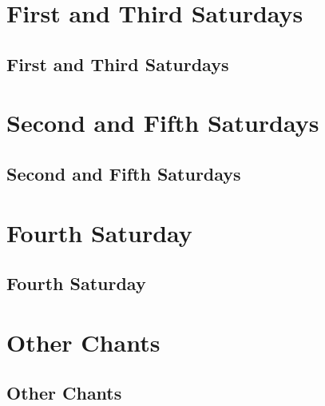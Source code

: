 \documentclass{kdo}
\begin{document}
\part{First and Third Saturdays}
\chapter{First and Third Saturdays}
\paliRefuges
\makaHannyaHaramittaShingyo
\enmeiJukkuKannonGyo
\songOfTheJewelMirrorSamadhi
\ancestorsShort
\femaleAncestors
\pagebreak
\jiHoSan

\part{Second and Fifth Saturdays}
\chapter{Second and Fifth Saturdays}
\paliRefuges
\makaHannyaHaramittaShingyo
\shosaimyoKichijoDharani
\harmonyOfDifferenceAndEquality
\ancestorsLong
\jiHoSan

\part{Fourth Saturday}
\chapter{Fourth Saturday}
\paliRefuges
\makaHannyaHaramittaShingyo
\shosaimyoKichijoDharani
\lovingKindnessMeditation
\enmeiJukkuKannonGyo
\jiHoSan

\part{Other Chants}
\chapter{Other Chants}
\end{document}
